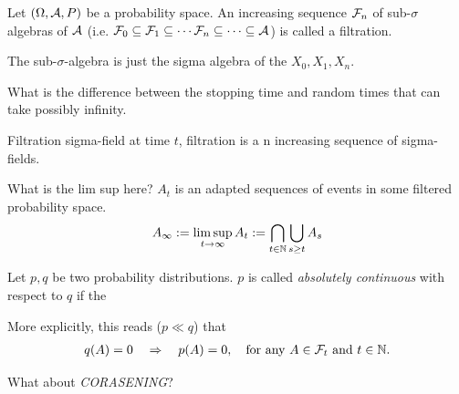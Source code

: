 \begin{define}[Filtration]
	Let $(\Omega, \mathcal{A}, P)$ be a probability space. An increasing sequence $\mathcal{F}_n$ of sub-$\sigma$ algebras of $\mathcal{A}$
	(i.e. $\mathcal{F}_0 \subseteq \mathcal{F}_1 \subseteq \cdots \mathcal{F}_n \subseteq \cdots \subseteq \mathcal{A}$) is called a filtration.
\end{define}

The sub-$\sigma$-algebra is just the sigma algebra of the $X_0, X_1, X_n$.

What is the difference between the stopping time and random times that can take possibly infinity.

Filtration sigma-field at time $t$, filtration is a n increasing sequence of sigma-fields.

What is the lim sup here? $A_t$ is an adapted sequences of events in some filtered probability space.
$$
	A_\infty := \limsup_{t\to \infty} A_t := \bigcap_{t\in\mathbb{N}}\bigcup_{s\geq t}A_s
$$

\begin{define}
	Let $p, q$ be two probability distributions. $p$ is called \emph{absolutely continuous} with respect to $q$ if the

	More explicitly, this reads ($p \ll q$) that
	\begin{align*}
		q(A) = 0 \quad \Rightarrow \quad p(A) = 0,  \quad \text{for any } A \in \Fc_t \text{ and } t \in \Nf.
	\end{align*}
\end{define}

What about \emph{CORASENING}?
